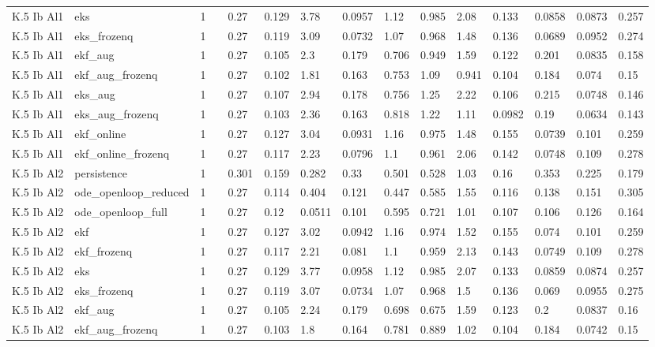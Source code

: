 \begin{table}[t]
\begin{tabular}{lllllllllllllll}
K.5 Ib Al1 & eks & 1 &  & 0.27 & 0.129 & 3.78 & 0.0957 & 1.12 & 0.985 & 2.08 & 0.133 & 0.0858 & 0.0873 & 0.257 \\
K.5 Ib Al1 & eks\_frozenq & 1 &  & 0.27 & 0.119 & 3.09 & 0.0732 & 1.07 & 0.968 & 1.48 & 0.136 & 0.0689 & 0.0952 & 0.274 \\
K.5 Ib Al1 & ekf\_aug & 1 &  & 0.27 & 0.105 & 2.3 & 0.179 & 0.706 & 0.949 & 1.59 & 0.122 & 0.201 & 0.0835 & 0.158 \\
K.5 Ib Al1 & ekf\_aug\_frozenq & 1 &  & 0.27 & 0.102 & 1.81 & 0.163 & 0.753 & 1.09 & 0.941 & 0.104 & 0.184 & 0.074 & 0.15 \\
K.5 Ib Al1 & eks\_aug & 1 &  & 0.27 & 0.107 & 2.94 & 0.178 & 0.756 & 1.25 & 2.22 & 0.106 & 0.215 & 0.0748 & 0.146 \\
K.5 Ib Al1 & eks\_aug\_frozenq & 1 &  & 0.27 & 0.103 & 2.36 & 0.163 & 0.818 & 1.22 & 1.11 & 0.0982 & 0.19 & 0.0634 & 0.143 \\
K.5 Ib Al1 & ekf\_online & 1 &  & 0.27 & 0.127 & 3.04 & 0.0931 & 1.16 & 0.975 & 1.48 & 0.155 & 0.0739 & 0.101 & 0.259 \\
K.5 Ib Al1 & ekf\_online\_frozenq & 1 &  & 0.27 & 0.117 & 2.23 & 0.0796 & 1.1 & 0.961 & 2.06 & 0.142 & 0.0748 & 0.109 & 0.278 \\
K.5 Ib Al2 & persistence & 1 &  & 0.301 & 0.159 & 0.282 & 0.33 & 0.501 & 0.528 & 1.03 & 0.16 & 0.353 & 0.225 & 0.179 \\
K.5 Ib Al2 & ode\_openloop\_reduced & 1 &  & 0.27 & 0.114 & 0.404 & 0.121 & 0.447 & 0.585 & 1.55 & 0.116 & 0.138 & 0.151 & 0.305 \\
K.5 Ib Al2 & ode\_openloop\_full & 1 &  & 0.27 & 0.12 & 0.0511 & 0.101 & 0.595 & 0.721 & 1.01 & 0.107 & 0.106 & 0.126 & 0.164 \\
K.5 Ib Al2 & ekf & 1 &  & 0.27 & 0.127 & 3.02 & 0.0942 & 1.16 & 0.974 & 1.52 & 0.155 & 0.074 & 0.101 & 0.259 \\
K.5 Ib Al2 & ekf\_frozenq & 1 &  & 0.27 & 0.117 & 2.21 & 0.081 & 1.1 & 0.959 & 2.13 & 0.143 & 0.0749 & 0.109 & 0.278 \\
K.5 Ib Al2 & eks & 1 &  & 0.27 & 0.129 & 3.77 & 0.0958 & 1.12 & 0.985 & 2.07 & 0.133 & 0.0859 & 0.0874 & 0.257 \\
K.5 Ib Al2 & eks\_frozenq & 1 &  & 0.27 & 0.119 & 3.07 & 0.0734 & 1.07 & 0.968 & 1.5 & 0.136 & 0.069 & 0.0955 & 0.275 \\
K.5 Ib Al2 & ekf\_aug & 1 &  & 0.27 & 0.105 & 2.24 & 0.179 & 0.698 & 0.675 & 1.59 & 0.123 & 0.2 & 0.0837 & 0.16 \\
K.5 Ib Al2 & ekf\_aug\_frozenq & 1 &  & 0.27 & 0.103 & 1.8 & 0.164 & 0.781 & 0.889 & 1.02 & 0.104 & 0.184 & 0.0742 & 0.15 \\

\end{tabular}
\end{table}
